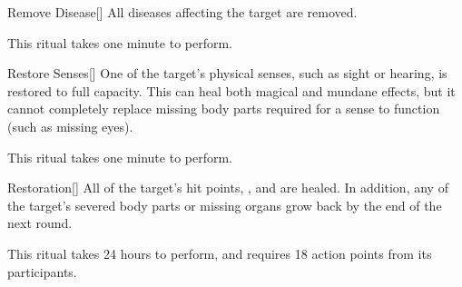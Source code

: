 \lowercase{\hypertarget{spell:Remove Disease}{}}\label{spell:Remove Disease}
\begin{apability}[Rank 3]{\hypertarget{spell:Remove Disease}{Remove Disease}}[]
All diseases affecting the target are removed.

This ritual takes one minute to perform.
\end{apability}
\vspace{0.25em}



\lowercase{\hypertarget{spell:Restore Senses}{}}\label{spell:Restore Senses}
\begin{apability}[Rank 3]{\hypertarget{spell:Restore Senses}{Restore Senses}}[]
One of the target's physical senses, such as sight or hearing, is restored to full capacity.
This can heal both magical and mundane effects, but it cannot completely replace missing body parts required for a sense to function (such as missing eyes).

This ritual takes one minute to perform.
\end{apability}
\vspace{0.25em}



\lowercase{\hypertarget{spell:Restoration}{}}\label{spell:Restoration}
\begin{apability}[Rank 4]{\hypertarget{spell:Restoration}{Restoration}}[]
All of the target's hit points, , and  are healed.
In addition, any of the target's severed body parts or missing organs grow back by the end of the next round.

This ritual takes 24 hours to perform, and requires 18 action points from its participants.
\end{apability}
\vspace{0.25em}



